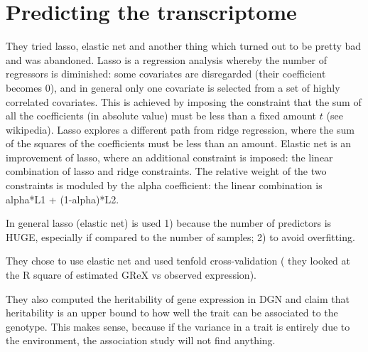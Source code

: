 \documentclass[../main.tex]{subfiles}
\begin{document}




\section{Predicting the transcriptome}

They tried lasso, elastic net and another thing which turned out to be 
pretty bad and was abandoned. Lasso is a regression analysis whereby the 
number of regressors is diminished: some covariates are disregarded 
(their coefficient becomes 0), and in general only one covariate is 
selected from a set of highly correlated covariates. This is achieved by 
imposing the constraint that the sum of all the coefficients (in 
absolute value) must be less than a fixed amount $t$ (see wikipedia). 
Lasso explores a different path from ridge regression, where the sum of 
the squares of the coefficients must be less than an amount. Elastic net 
is an improvement of lasso, where an additional constraint is imposed: 
the linear combination of lasso and ridge constraints. The relative 
weight of the two constraints is moduled by the alpha coefficient: the 
linear combination is alpha*L1 + (1-alpha)*L2.

In general lasso (elastic net) is used 1) because the number of 
predictors is HUGE, especially if compared to the number of samples; 2) 
to avoid overfitting.

They chose to use elastic net and used tenfold cross-validation (\ie 
they looked at the R square of estimated GReX vs observed expression).

They also computed the heritability of gene expression in DGN and claim 
that heritability  is an upper 
bound to how well the trait can be associated to the genotype. This 
makes sense, because if the variance in a trait is entirely due to the 
environment, the association study will not find anything.
\end{document}
